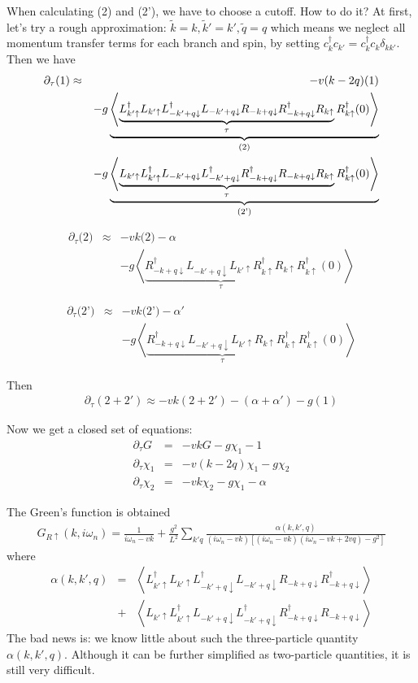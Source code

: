 \documentclass[10pt]{article}
\newcommand{\bea}{\begin{eqnarray}}
\newcommand{\eea}{\end{eqnarray}}
\begin{document}
When calculating (2) and (2'), we have to choose a cutoff. How to do it? At first, let's try a rough approximation: $\tilde{k}=k, \tilde{k}'=k', \tilde{q}=q$ which means we neglect all momentum transfer terms for each branch and spin, by setting $c_k^\dag c_{k'}=c_k^\dag c_k \delta_{kk'}$. Then we have
\bea \partial_\tau\text{(1)}&\approx&-v(k-2q){\text(1)} \nonumber\\
&&-g\underbrace{\left\langle \underbrace{L_{{k}'\uparrow}^\dag L_{k'\uparrow} L_{-{k}'+{q}\downarrow}^\dag L_{-k'+q\downarrow} R_{-{k}+{q}\downarrow} R_{-k+q\downarrow}^\dag R_{{k}\uparrow}}_{\tau} R_{k\uparrow}^\dag(0) \right\rangle}_{\text{(2)}} \nonumber\\
&&-g\underbrace{\left\langle \underbrace{L_{k'\uparrow} L_{{k}'\uparrow}^\dag L_{-k'+q\downarrow} L_{-{k}'+{q}\downarrow}^\dag R_{-k+q\downarrow}^\dag R_{-{k}+{q}\downarrow} R_{{k}\uparrow}}_{\tau} R_{k\uparrow}^\dag(0) \right\rangle}_{\text{(2')}} \eea 

\bea \partial_\tau \text{(2)} &\approx& -vk \text{(2)} - \alpha \nonumber\\
&& -g \left\langle \underbrace{R_{-k+q\downarrow}^\dag L_{-k'+q\downarrow} L_{k'\uparrow} R_{k\uparrow}^\dag R_{k\uparrow}}_{\tau} R_{k\uparrow}^\dag(0) \right\rangle 
\eea

\bea \partial_\tau \text{(2')} &\approx& -vk \text{(2')} - \alpha' \nonumber\\
&& -g \left\langle \underbrace{R_{-k+q\downarrow}^\dag L_{-k'+q\downarrow} L_{k'\uparrow} R_{k\uparrow} R_{k\uparrow}^\dag }_{\tau} R_{k\uparrow}^\dag(0) \right\rangle 
\eea

Then
\bea \partial_\tau (2+2')\approx -vk(2+2') - (\alpha+\alpha') -g(1) \eea

Now we get a closed set of equations:
\bea \partial_\tau G &=& -vkG-g\chi_1-1 \nonumber\\
 \partial_\tau \chi_1 &=& -v(k-2q)\chi_1-g\chi_2 \nonumber\\
 \partial_\tau \chi_2 &=& -vk\chi_2 -g\chi_1 -\alpha  \eea

The Green's function is obtained
\bea G_{R\uparrow}(k,i\omega_n)=\frac{1}{i\omega_n-vk}+\frac{ g^2}{L^2}\sum_{k'q}\frac{\alpha(k,k',q)}{(i\omega_n-vk)[(i\omega_n-vk)(i\omega_n-vk+2vq)-g^2]} \eea
where
\bea \alpha(k,k',q)&=&\left\langle L_{{k}'\uparrow}^\dag L_{k'\uparrow} L_{-{k}'+{q}\downarrow}^\dag L_{-k'+q\downarrow} R_{-{k}+{q}\downarrow} R_{-k+q\downarrow}^\dag\right\rangle \nonumber\\&+& \left\langle L_{k'\uparrow} L_{{k}'\uparrow}^\dag L_{-k'+q\downarrow} L_{-{k}'+{q}\downarrow}^\dag R_{-k+q\downarrow}^\dag R_{-{k}+{q}\downarrow} \right\rangle \eea
The bad news is: we know little about such the three-particle quantity $\alpha(k,k',q)$. Although it can be further simplified as two-particle quantities, it is still very difficult.


%
\end{document}
